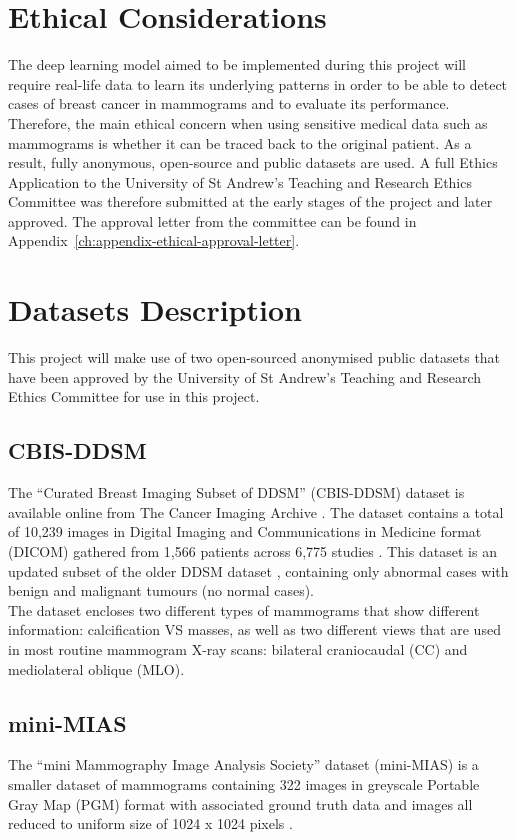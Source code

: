 \section{Ethical Considerations}

The deep learning model aimed to be implemented during this project will require real-life data to learn its underlying patterns in order to be able to detect cases of breast cancer in mammograms and to evaluate its performance. Therefore, the main ethical concern when using sensitive medical data such as  mammograms is whether it can be traced back to the original patient. As a result, fully anonymous, open-source and public datasets are used. A full Ethics Application to the University of St Andrew's Teaching and Research Ethics Committee was therefore submitted at the early stages of the project and later approved. The approval letter from the committee can be found in Appendix~\ref{ch:appendix-ethical-approval-letter}.


\section{Datasets Description}

This project will make use of two open-sourced anonymised public datasets that have been approved by the University of St Andrew's Teaching and Research Ethics Committee for use in this project.

\subsection{CBIS-DDSM}

The ``Curated Breast Imaging Subset of DDSM'' (CBIS-DDSM) dataset \citep{Lee2017} is available online from The Cancer Imaging Archive \citep{Clark2013}. The dataset contains a total of 10,239 images in Digital Imaging and Communications in Medicine format (DICOM) gathered from 1,566 patients across 6,775 studies \citep{Lee2017}. This dataset is an updated subset of the older DDSM dataset \citep{DDSMdataset2001}, containing only abnormal cases with benign and malignant tumours (no normal cases).\\

The dataset encloses two different types of mammograms that show different information: calcification VS masses, as well as two different views that are used in most routine mammogram X-ray scans: bilateral craniocaudal (CC) and mediolateral oblique (MLO).

\subsection{mini-MIAS}

The ``mini Mammography Image Analysis Society'' dataset (mini-MIAS) is a smaller dataset of mammograms containing 322 images in greyscale Portable Gray Map (PGM) format with associated ground truth data \citep{Suckling1994} and images all reduced to uniform size of 1024 x 1024 pixels \citep{Vishrutha2014}.